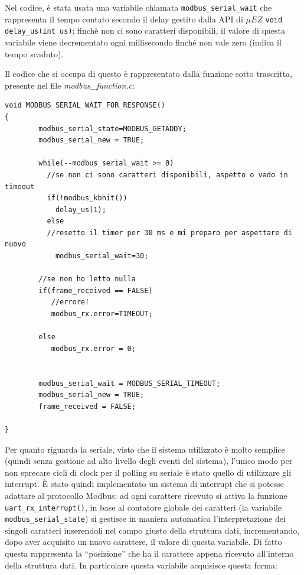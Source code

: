 \documentclass[a4paper,titlepage]{book}
\begin{document}
Nel codice, è stata usata una variabile chiamata \lstinline!modbus_serial_wait! che rappresenta il tempo contato secondo il delay gestito dalla API di $\mu EZ$ \lstinline!void delay_us(int us)!; finchè non ci sono caratteri disponibili, il valore di questa variabile viene decrementato ogni millisecondo finché non vale zero (indica il tempo scaduto).

Il codice che si occupa di questo è rappresentato dalla funzione sotto trascritta, presente nel file \textit{modbus\_function.c}:

\begin{lstlisting}[showlines=true,firstline=1, firstnumber=110]
void MODBUS_SERIAL_WAIT_FOR_RESPONSE()
{
        modbus_serial_state=MODBUS_GETADDY;
        modbus_serial_new = TRUE;

        while(--modbus_serial_wait >= 0)
          //se non ci sono caratteri disponibili, aspetto o vado in timeout
          if(!modbus_kbhit())
            delay_us(1);
          else
          //resetto il timer per 30 ms e mi preparo per aspettare di nuovo
            modbus_serial_wait=30;

        //se non ho letto nulla
        if(frame_received == FALSE)
           //errore!
           modbus_rx.error=TIMEOUT;

        else
           modbus_rx.error = 0;


        modbus_serial_wait = MODBUS_SERIAL_TIMEOUT;
        modbus_serial_new = TRUE;
        frame_received = FALSE;

}
\end{lstlisting}

Per quanto riguarda la seriale, visto che il sistema utilizzato è molto semplice (quindi senza gestione ad alto livello degli eventi del sistema), l'unico modo per non sprecare cicli di clock per il polling su seriale è stato quello di utilizzare gli interrupt. È stato quindi implementato un sistema di interrupt che si potesse adattare al protocollo Modbus: ad ogni carattere ricevuto si attiva la funzione \lstinline!uart_rx_interrupt()!,  in base al contatore globale dei caratteri (la variabile \lstinline!modbus_serial_state!) si gestisce in maniera automatica l'interpretazione dei singoli caratteri inserendoli nel campo giusto della struttura dati, incrementando, dopo aver acquisito un nuovo carattere, il valore di questa variabile. Di fatto questa rappresenta la ``posizione'' che ha il carattere appena ricevuto all'interno della struttura dati.
In particolare questa variabile acquisisce questa forma:
\end{document}
